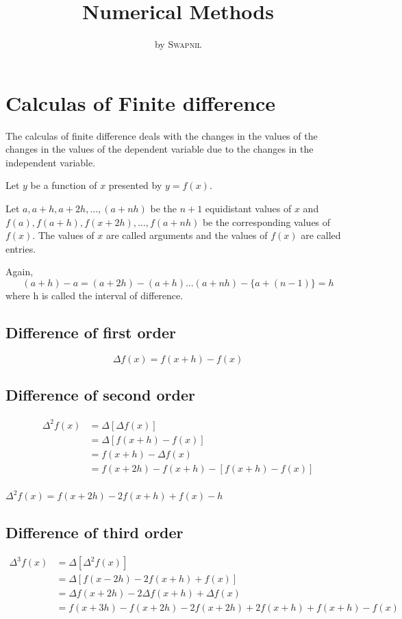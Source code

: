 \documentclass[11pt, a4paper]{article}
\title{Numerical Methods}
\author{ by
  \textsc{Swapnil}%
}
\date{}
\begin{document}
\maketitle
\tableofcontents
\thispagestyle{empty}
\newpage
\parindent0pt

\section{Calculas of Finite difference}%
The calculas of finite difference deals with the changes in the values of the 
changes in the values of the dependent variable due to the changes in the 
independent variable.

Let $y$ be a function of $x$ presented by $y=f(x)$.

Let $a, a+h, a+2h, \dots, (a+nh)$ be the $n+1$ equidistant values of $x$ and
$f(a), f(a+h), f(x+2h), \dots, f(a+nh)$ be the corresponding values of $f(x)$.
The values of $x$ are called arguments and the values of $f(x)$ are called
entries.

Again,
$$
(a+h)-a=(a+2h)-(a+h)\dots(a+nh)-\{ a+(n-1) \} = h
$$
where h is called the interval of difference.
\subsection{Difference of first order}
$$
\Delta f(x)=f(x+h)-f(x)
$$
\subsection{Difference of second order}
\begin{align*}
  \Delta^2f(x) &= \Delta[\Delta f(x)]\\
               &= \Delta[f(x+h)-f(x)]\\
               &= f(x+h)-\Delta f(x)\\
               &= f(x+2h)-f(x+h)-[f(x+h)-f(x)]\\
\end{align*}

\begin{tcolorbox}
  \begin{center}

    $\Delta^2f(x) = f(x+2h)-2f(x+h)+f(x)-h$

  \end{center}
\end{tcolorbox}

\subsection{Difference of third order}
\begin{align*}
  \Delta^3f(x) &= \Delta[\Delta^2f(x)]\\
               &= \Delta[f(x-2h)-2f(x+h)+f(x)]\\
               &= \Delta f(x+2h)-2\Delta f(x+h) + \Delta f(x)\\
               &= f(x+3h)-f(x+2h)-2f(x+2h)+2f(x+h)+f(x+h)-f(x)\\
\end{align*}
\end{document}
